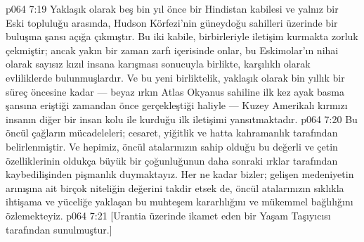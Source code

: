 \vs p064 7:19 Yaklaşık olarak beş bin yıl önce bir Hindistan kabilesi ve yalnız bir Eski topluluğu arasında, Hudson Körfezi’nin güneydoğu sahilleri üzerinde bir buluşma şansı açığa çıkmıştır. Bu iki kabile, birbirleriyle iletişim kurmakta zorluk çekmiştir; ancak yakın bir zaman zarfı içerisinde onlar, bu Eskimolar’ın nihai olarak sayısız kızıl insana karışması sonucuyla birlikte, karşılıklı olarak evliliklerde bulunmuşlardır. Ve bu yeni birliktelik, yaklaşık olarak bin yıllık bir süreç öncesine kadar --- beyaz ırkın Atlas Okyanus sahiline ilk kez ayak basma şansına eriştiği zamandan önce gerçekleştiği haliyle --- Kuzey Amerikalı kırmızı insanın diğer bir insan kolu ile kurduğu ilk iletişimi yansıtmaktadır.
\vs p064 7:20 Bu öncül çağların mücadeleleri; cesaret, yiğitlik ve hatta kahramanlık tarafından belirlenmiştir. Ve hepimiz, öncül atalarınızın sahip olduğu bu değerli ve çetin özelliklerinin oldukça büyük bir çoğunluğunun daha sonraki ırklar tarafından kaybedilişinden pişmanlık duymaktayız. Her ne kadar bizler; gelişen medeniyetin arınışına ait birçok niteliğin değerini takdir etsek de, öncül atalarınızın sıklıkla ihtişama ve yüceliğe yaklaşan bu muhteşem kararlılığını ve mükemmel bağlılığını özlemekteyiz.
\vs p064 7:21 [Urantia üzerinde ikamet eden bir Yaşam Taşıyıcısı tarafından sunulmuştur.]
